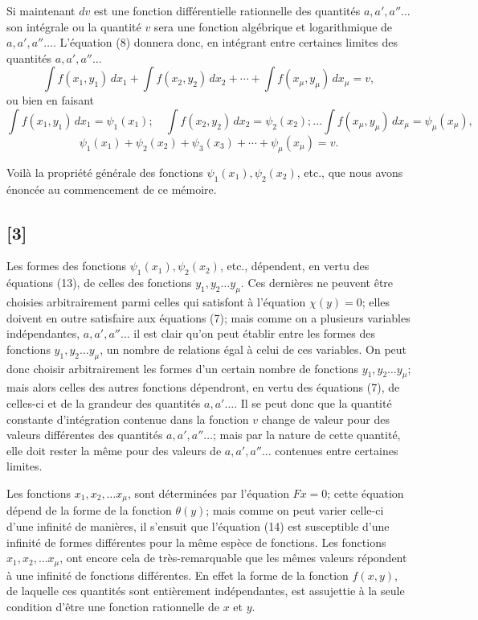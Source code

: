 \documentclass{article}
\begin{document}
Si maintenant $dv$ est une fonction différentielle rationnelle des quantités $a, a', a'' \ldots$ son intégrale ou la quantité $v$ sera une fonction algébrique et logarithmique de $a, a', a'' \ldots$. L'équation (8) donnera donc, en intégrant entre certaines limites des quantités $a, a', a'' \ldots$
\[ \int f(x_1, y_1)\,dx_1 + \int f(x_2, y_2)\,dx_2 + \cdots + \int f(x_\mu, y_\mu)\,dx_\mu = v, \tag{12} \]
ou bien en faisant
\[ \int f(x_1, y_1)\,dx_1 = \psi_1(x_1); \quad \int f(x_2, y_2)\,dx_2 = \psi_2(x_2); \ldots \int f(x_\mu, y_\mu)\,dx_\mu = \psi_\mu(x_\mu), \tag{13} \]
\[ \psi_1(x_1) + \psi_2(x_2) + \psi_3(x_3) + \cdots + \psi_\mu(x_\mu) = v. \tag{14} \]

Voilà la propriété générale des fonctions $\psi_1(x_1), \psi_2(x_2)$, etc., que nous avons énoncée au commencement de ce mémoire.

\subsection*{[3]}

Les formes des fonctions $\psi_1(x_1), \psi_2(x_2)$, etc., dépendent, en vertu des équations (13), de celles des fonctions $y_1, y_2 \ldots y_\mu$. Ces dernières ne peuvent être choisies arbitrairement parmi celles qui satisfont à l'équation $\chi(y) = 0$; elles doivent en outre satisfaire aux équations (7); mais comme on a plusieurs variables indépendantes, $a, a', a'' \ldots$ il est clair qu'on peut établir entre les formes des fonctions $y_1, y_2 \ldots y_\mu$, un nombre de relations égal à celui de ces variables. On peut donc choisir arbitrairement les formes d'un certain nombre de fonctions $y_1, y_2 \ldots y_\mu$; mais alors celles
des autres fonctions dépendront, en vertu des équations (7), de celles-ci et de la grandeur des quantités $a, a' \ldots$. Il se peut donc que la quantité constante d'intégration contenue dans la fonction $v$ change de valeur pour des valeurs différentes des quantités $a, a', a'' \ldots$; mais par la nature de cette quantité, elle doit rester la même pour des valeurs de $a, a', a'' \ldots$ contenues entre certaines limites.

Les fonctions $x_1, x_2, \ldots x_\mu$, sont déterminées par l'équation $F x = 0$; cette équation dépend de la forme de la fonction $\theta(y)$; mais comme on peut varier celle-ci d'une infinité de manières, il s'ensuit que l'équation (14) est susceptible d'une infinité de formes différentes pour la même espèce de fonctions. Les fonctions $x_1, x_2, \ldots x_\mu$, ont encore cela de très-remarquable que les mêmes valeurs répondent à une infinité de fonctions différentes. En effet la forme de la fonction $f(x, y)$, de laquelle ces quantités sont entièrement indépendantes, est assujettie à la seule condition d'être une fonction rationnelle de $x$ et $y$.
\end{document}
